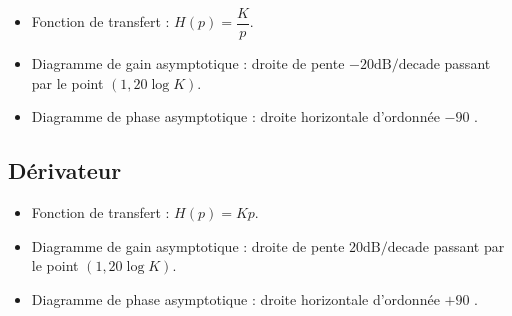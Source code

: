 \begin{resultat}
\begin{itemize}
\item Fonction de transfert : $H(p)=\dfrac{K}{p}$.
\item Diagramme de gain asymptotique : droite de pente $-{20}\text{dB/decade}$ passant par le point $(1,20\log K)$.
\item Diagramme de phase asymptotique : droite horizontale d'ordonnée $-90$ \degre.
\end{itemize}
\end{resultat}



\subsection{Dérivateur}

\begin{marginfigure}
\end{marginfigure}

\begin{resultat}
\begin{itemize}
\item Fonction de transfert : $H(p)={K}{p}$.
\item Diagramme de gain asymptotique : droite de pente ${20}\text{dB/decade}$ passant par le point $(1,20\log K)$.
\item Diagramme de phase asymptotique : droite horizontale d'ordonnée $+90$ \degre.
\end{itemize}
\end{resultat}



